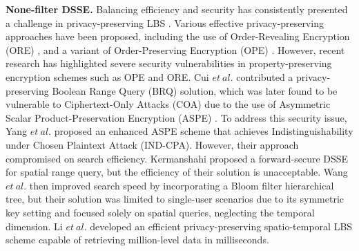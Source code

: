 \textbf{None-filter DSSE.} Balancing efficiency and security has consistently presented a challenge in privacy-preserving LBS \cite{kerschbaum2014optimal,grubbs2017leakage,wang2022quickn,guo2022search}. Various effective privacy-preserving approaches have been proposed, including the use of Order-Revealing Encryption (ORE) \cite{kerschbaum2014optimal}, and a variant of Order-Preserving Encryption (OPE) \cite{wang2022quickn}. However, recent research \cite{grubbs2017leakage} has highlighted severe security vulnerabilities in property-preserving encryption schemes such as OPE and ORE. Cui $et\ al.$ \cite{cui2019geo} contributed a privacy-preserving Boolean Range Query (BRQ) solution, which was later found to be vulnerable to Ciphertext-Only Attacks (COA) \cite{li2019insecurity} due to the use of Asymmetric Scalar Product-Preservation Encryption (ASPE) \cite{wong2009secure}.
To address this security issue, Yang $et\ al.$ \cite{yang2022lightweight} proposed an enhanced ASPE scheme that achieves Indistinguishability under Chosen Plaintext Attack (IND-CPA). However, their approach compromised on search efficiency. Kermanshahi \cite{kermanshahi2020geometric} proposed a forward-secure DSSE for spatial range query, but the efficiency of their solution is unacceptable. Wang $et\ al.$ \cite{wang2021enabling} then improved search speed by incorporating a Bloom filter hierarchical tree, but their solution was limited to single-user scenarios due to its symmetric key setting and focused solely on spatial queries, neglecting the temporal dimension.  Li $et\ al.$ \cite{li2023enabling} developed an efficient privacy-preserving spatio-temporal LBS scheme capable of retrieving million-level data in milliseconds.

